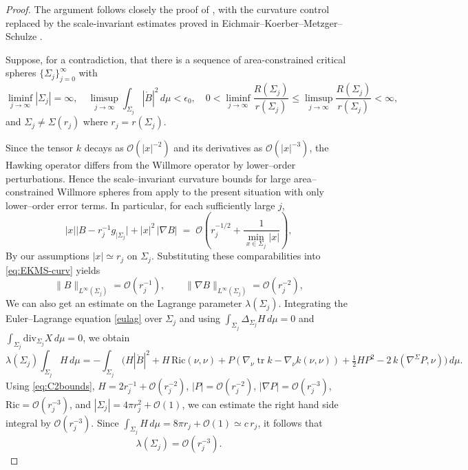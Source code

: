 \documentclass[12pt,a4paper]{amsart}
\theoremstyle{plain}
\theoremstyle{definition}
\begin{document}
\begin{proof}
The argument follows closely the proof of \cite[Theorem 8]{eichko}, with the curvature control replaced by the scale-invariant estimates proved in 
Eichmair--Koerber--Metzger--Schulze \cite{eichmair2024huisken}.


 Suppose, for a contradiction, that there is a sequence of area-constrained critical spheres \(\{\Sigma_j\}_{j=0}^\infty\) with
\[
\liminf_{j \to \infty} |\Sigma_j| = \infty, \quad \limsup_{j \to \infty} \int_{\Sigma_j} |\mathring{B}|^2 \, d\mu < \epsilon_0, \quad 0 < \liminf_{j \to \infty} \frac{R(\Sigma_j)}{r(\Sigma_j)} \leq \limsup_{j \to \infty} \frac{R(\Sigma_j)}{r(\Sigma_j)} < \infty,
\]
and \(\Sigma_j \neq \Sigma(r_j)\) where \(r_j = r(\Sigma_j)\). 


Since the tensor $k$ decays as $\mathcal{O}(|x|^{-2})$ and its derivatives as $\mathcal{O}(|x|^{-3})$, 
the Hawking operator differs from the Willmore operator by lower--order perturbations.
Hence the scale–invariant curvature bounds for large area–constrained Willmore spheres 
from \cite[Lemmas 6 and 8, Proposition 10, Corollary 14]{eichmair2024huisken} 
apply to the present situation with only lower–order error terms.   In particular, for each sufficiently large $j$, 
\begin{equation}\label{eq:EKMS-curv}
 |x| \big|B - r_j^{-1} g_{|\Sigma_j}\big|
  + |x|^2\,|\nabla B|
  \;=\;
  \mathcal{O}(r_j^{-1/2}+ \frac{1}{\min_{x\in\Sigma_j} |x|}),
\end{equation}
By our assumptions $|x|\simeq r_j$ on $\Sigma_j$.
Substituting these comparabilities into \eqref{eq:EKMS-curv} yields
\begin{equation}\label{eq:C2bounds}
  \|B\|_{L^{\infty}(\Sigma_j)} = \mathcal{O}(r_j^{-1}),
  \qquad
  \|\nabla B\|_{L^{\infty}(\Sigma_j)} = \mathcal{O}(r_j^{-2}),
\end{equation}
We can also get an estimate on the Lagrange parameter $\lambda(\Sigma_j)$. Integrating the Euler–Lagrange equation \eqref{eulag}  over $\Sigma_j$
and using $\int_{\Sigma_j}\Delta_{\Sigma_j} H\,d\mu=0$ and $\int_{\Sigma_j}\mathrm{div}_{\Sigma_j} X\,d\mu=0$, we obtain
\[
\lambda(\Sigma_j)\int_{\Sigma_j} H\,d\mu
= -\!\int_{\Sigma_j}\!\Big(H|\mathring{B}|^2 + H\,\mathrm{Ric}(\nu,\nu)
+ P(\nabla_\nu \operatorname{tr}k - \nabla_\nu k(\nu,\nu))
+ \tfrac12 H P^2 - 2\,k(\nabla^\Sigma P,\nu)\Big)\,d\mu.
\]
Using \eqref{eq:C2bounds}, $H=2r_j^{-1}+\mathcal{O}(r_j^{-2})$, $|P|=\mathcal{O}(r_j^{-2})$, $|\nabla P|=\mathcal{O}(r_j^{-3})$,
$\mathrm{Ric}=\mathcal{O}(r_j^{-3})$, and $|\Sigma_j|=4\pi r_j^2+\mathcal{O}(1)$, we can estimate the right hand side integral by $\mathcal{O}(r_j^{-3})$.
Since $\int_{\Sigma_j} H\,d\mu = 8\pi r_j + \mathcal{O}(1)\simeq c\,r_j$, it follows that
\begin{equation}\label{eq:lambda}
  \lambda(\Sigma_j) = \mathcal{O}(r_j^{-3}).
\end{equation}



\end{proof}
\end{document}

